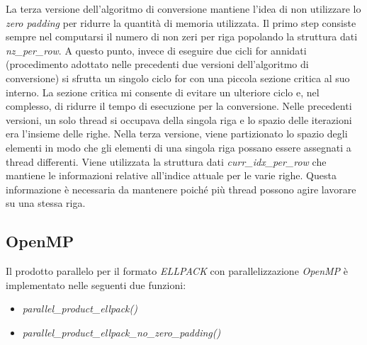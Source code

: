 \documentclass{article}
\begin{document}
La terza versione dell'algoritmo di conversione mantiene l'idea di non utilizzare lo \textit{zero padding} per ridurre la quantità di memoria utilizzata. Il primo step consiste sempre nel computarsi il numero di non zeri per riga popolando la struttura dati \textit{nz\_per\_row}. A questo punto, invece di eseguire due cicli for annidati (procedimento adottato nelle precedenti due versioni dell'algoritmo di conversione) si sfrutta un singolo ciclo for con una piccola sezione critica al suo interno. La sezione critica mi consente di evitare un ulteriore ciclo e, nel complesso, di ridurre il tempo di esecuzione per la conversione. Nelle precedenti versioni, un solo thread si occupava della singola riga e lo spazio delle iterazioni era l'insieme delle righe. Nella terza versione, viene partizionato lo spazio degli elementi in modo che gli elementi di una singola riga possano essere assegnati a thread differenti. Viene utilizzata la struttura dati \textit{curr\_idx\_per\_row} che mantiene le informazioni relative all'indice attuale per le varie righe. Questa informazione è necessaria da mantenere poiché più thread possono agire lavorare su una stessa riga.

\subsection{OpenMP}
Il prodotto parallelo per il formato \textit{ELLPACK} con parallelizzazione \textit{OpenMP} è implementato nelle seguenti due funzioni:

\begin{itemize}
\item \textit{parallel\_product\_ellpack()}
\item \textit{parallel\_product\_ellpack\_no\_zero\_padding()}
\end{itemize}
\end{document}
